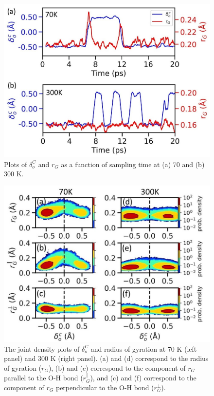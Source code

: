 \begin{figure}
\centering
\includegraphics[width=15cm ]{./Chapter1/new_figures/tunnelling_vs_shuttling_2.jpg}
\caption{Plots of $\delta_o^C$ and $r_G$ as a function of sampling time
at (a) 70 and (b) 300 K. }
\label{fig:tunnel2}
\end{figure}

\begin{figure}
\centering
\includegraphics[width=15cm ]{./Chapter1/new_figures/tunnelling_vs_shuttling_1.jpg}
\caption{The joint density plots of $\delta_o^C$ and radius of gyration at 70 K (left panel) and 300 K (right panel). (a) and (d) correspond to the radius of gyration ($r_G$), (b) and (e) correspond to the component of $r_G$ parallel to the O-H bond ($r_G^{\parallel}$), and (c) and (f) correspond to the component of $r_G$ perpendicular to the O-H bond ($r_G^{\bot}$).}
\label{fig:tunnel1}
\end{figure}

